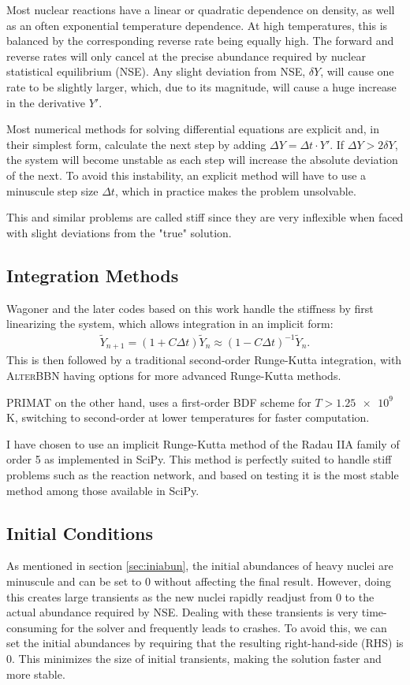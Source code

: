 Most nuclear reactions have a linear or quadratic dependence on density, as well as an often exponential temperature dependence. At high temperatures, this is balanced by the corresponding reverse rate being equally high. The forward and reverse rates will only cancel at the precise abundance required by nuclear statistical equilibrium (NSE). Any slight deviation from NSE, $\delta Y$, will cause one rate to be slightly larger, which, due to its magnitude, will cause a huge increase in the derivative $Y'$.

Most numerical methods for solving differential equations are explicit and, in their simplest form, calculate the next step by adding  $\Delta Y = \Delta t \cdot Y' $. 
If $\Delta Y>2\delta Y$, the system will become unstable as each step will increase the absolute deviation of the next. To avoid this instability, an explicit method will have to use a minuscule step size $\Delta t$, which in practice makes the problem unsolvable. 

This and similar problems are called stiff since they are very inflexible when faced with slight deviations from the "true" solution. 


\subsection{Integration Methods}

Wagoner and the later codes based on this work handle the stiffness by first linearizing the system, which allows integration in an implicit form:
\begin{align}
    \tilde{Y}_{n+1}=(1+C \Delta t)\tilde{Y}_{n}\approx(1-C \Delta t)^{-1}\tilde{Y}_{n}.
\end{align}
This is then followed by a traditional second-order Runge-Kutta integration, with \textsc{AlterBBN} having options for more advanced Runge-Kutta methods. 

PRIMAT on the other hand, uses a first-order BDF scheme for $T>\num{1.25e9}$ K, switching to second-order at lower temperatures for faster computation.

I have chosen to use an implicit Runge-Kutta method of the Radau IIA family of order 5 as implemented in SciPy\cite{SciPy}. This method is perfectly suited to handle stiff problems such as the reaction network, and based on testing it is the most stable method among those available in SciPy.

\subsection{Initial Conditions}
As mentioned in section \ref{sec:iniabun}, the initial abundances of heavy nuclei are minuscule and can be set to 0 without affecting the final result. However, doing this creates large transients as the new nuclei rapidly readjust from 0 to the actual abundance required by NSE. Dealing with these transients is very time-consuming for the solver and frequently leads to crashes. To avoid this, we can set the initial abundances by requiring that the resulting right-hand-side (RHS) is 0. This minimizes the size of initial transients, making the solution faster and more stable.


